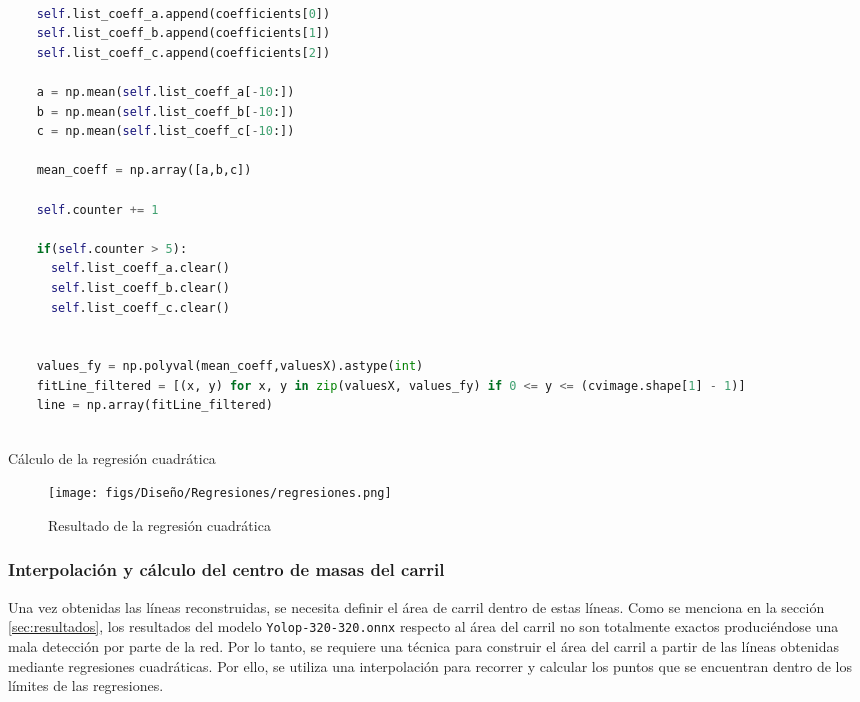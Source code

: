 \begin{code}[H]
  \begin{lstlisting}[language=Python]

    self.list_coeff_a.append(coefficients[0])
    self.list_coeff_b.append(coefficients[1])
    self.list_coeff_c.append(coefficients[2])

    a = np.mean(self.list_coeff_a[-10:])
    b = np.mean(self.list_coeff_b[-10:])
    c = np.mean(self.list_coeff_c[-10:])

    mean_coeff = np.array([a,b,c])

    self.counter += 1

    if(self.counter > 5):
      self.list_coeff_a.clear()
      self.list_coeff_b.clear()
      self.list_coeff_c.clear()  


    values_fy = np.polyval(mean_coeff,valuesX).astype(int)
    fitLine_filtered = [(x, y) for x, y in zip(valuesX, values_fy) if 0 <= y <= (cvimage.shape[1] - 1)]
    line = np.array(fitLine_filtered)
   

  \end{lstlisting}
  \caption[Cálculo de la regresión cuadrática]{Cálculo de la regresión cuadrática}
  \label{cod:regresión}
  \end{code}  
\begin{figure} [H]
  \begin{center}
    \texttt{[image: figs/Diseño/Regresiones/regresiones.png]}
  \end{center}
  \caption{Resultado de la regresión cuadrática}
  \label{fig:regresión cuadrática}
\end{figure}

\subsubsection{Interpolación y cálculo del centro de masas del carril}
\label{sec:Interpolación y cálculo del centro de masas del carril}

Una vez obtenidas las líneas reconstruidas, se necesita definir el área de carril dentro de estas líneas. Como se menciona en la sección 
\ref{sec:resultados}, los resultados del modelo \texttt{Yolop-320-320.onnx} respecto al área del carril no son totalmente exactos produciéndose una mala detección por parte de la red. Por lo tanto, se requiere
una técnica para construir el área del carril a partir de las líneas obtenidas mediante regresiones cuadráticas. Por ello, se utiliza una interpolación para recorrer y calcular los puntos que se encuentran
dentro de los límites de las regresiones.

